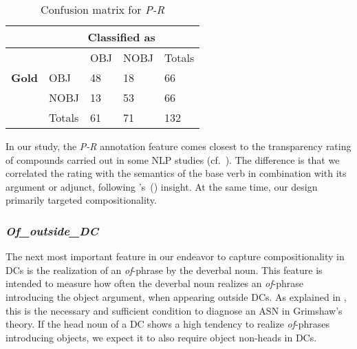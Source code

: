 \documentclass[output=paper]{langsci/langscibook}
\begin{document}
\begin{table}
\caption{\label{tab:conf:p-r} Confusion matrix for \textit{P-R}}
{\footnotesize
\begin{tabular}{|l|l|l|l|l|}
\hline
&\multicolumn{4}{c|}{\textbf{Classified as}}\\
\hline
&&  OBJ&NOBJ&Totals \\    
\textbf{Gold} & OBJ &48 &18&66 \\
& NOBJ&13 & 53&66  \\
\hline
&Totals&61 &71&132\\
\hline
\end{tabular}}
\end{table}



In our study, the \textit{P-R} annotation feature comes closest to the  {transparency} rating of compounds carried out in some NLP studies (cf.~). The difference is that we correlated the rating with the semantics of the base verb in combination with its argument or adjunct, following \citeauthor{grimshaw:90}'s~(\citeyear{grimshaw:90}) insight.  {At the same time, our design primarily targeted compositionality.} 


\subsubsection{\textit{Of\_outside\_DC}}\label{sec:gia:discussion-int-of}

The next most important feature in our endeavor to capture compositionality in DCs is the realization of an \textit{of}-phrase by the deverbal noun. This feature is intended to measure how often the deverbal noun realizes an \textit{of}-phrase introducing the object argument, when appearing outside DCs. As explained in , this is the necessary and sufficient condition to diagnose an ASN in Grimshaw's theory. If the head noun of a DC shows a high tendency to realize \textit{of}-phrases introducing objects, we expect it to also require object non-heads in DCs.
\end{document}
